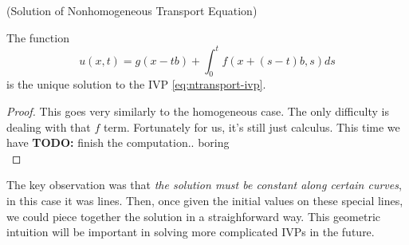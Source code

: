 \documentclass{bkcnotes}
\newcommand{\todo}[1]{{\bf TODO: } #1\\}
\begin{document}
\begin{nthm}(Solution of Nonhomogeneous Transport Equation)

  The function
  \begin{equation}
    \label{eq:ntransport-sol}
    u(x,t) = g(x-tb) + \int_0^t f(x+(s-t)b,s)ds
  \end{equation}
  is the unique solution to the IVP \eqref{eq:ntransport-ivp}.
\end{nthm}
\begin{proof}
  This goes very similarly to the homogeneous case. The only
  difficulty is dealing with that $f$ term. Fortunately for us, it's
  still just calculus. This time we have
  \todo{finish the computation.. boring}
\end{proof}

The key observation was that \emph{the solution must be constant along
  certain curves}, in this case it was lines. Then, once given the
initial values on these special lines, we could piece together the
solution in a straighforward way. This geometric intuition will be
important in solving more complicated IVPs in the future.
\end{document}
